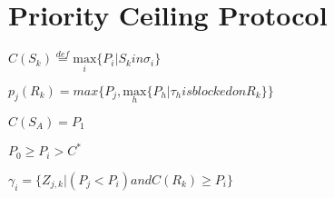 \section{Priority Ceiling Protocol}

$ C(S_{k})\stackrel{def}{=}\underset{i}{\mathrm{max}} \{P_{i}| S_{k} in \sigma_{i}\}   $

$ p_{j}(R_{k})=max\{P_{j},\underset{h}{\mathrm{max}}\{P_{h}|\tau_{h} is blocked on R_{k}\}\} $

$ C(S_{A})=P_{1} $

$ P_{0}\geq P_{i} >C^{\ast} $

$ \gamma_{i}=\{Z_{j,k} | (P_{j}<P_{i}) and C(R_{k})\geq P_{i} \} $